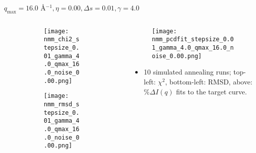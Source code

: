 \documentclass{beamer}
\begin{document}
\begin{frame}{$ q_{\textrm{max}}=16.0 $ \AA $^{-1}, \eta=0.00, \Delta s=0.01, \gamma=4.0$}
	\begin{columns}
		\begin{column}{.5\textwidth}
			\begin{figure}[H]
			\centering
			\begin{subfigure}[b]{\textwidth}
				\centering
				\texttt{[image: nmm\_chi2\_stepsize\_0.01\_gamma\_4.0\_qmax\_16.0\_noise\_0.00.png]}
				\label{fig:}
			\end{subfigure}
			\begin{subfigure}[b]{\textwidth}
				\centering
				\texttt{[image: nmm\_rmsd\_stepsize\_0.01\_gamma\_4.0\_qmax\_16.0\_noise\_0.00.png]}
				\label{fig:}
			\end{subfigure}
			\end{figure}
		\end{column}
		\begin{column}{.5\textwidth}
			\begin{figure}[H]
				\centering
				\texttt{[image: nmm\_pcdfit\_stepsize\_0.01\_gamma\_4.0\_qmax\_16.0\_noise\_0.00.png]}
				\label{fig:}
			\end{figure}
			\begin{itemize}
				\item 10 simulated annealing runs; top-left: $\chi^2$, bottom-left: RMSD, above: $\%\Delta I(q)$ fits to the target curve.
			\end{itemize}
		\end{column}
	\end{columns}
\end{frame}
 
\end{document}
